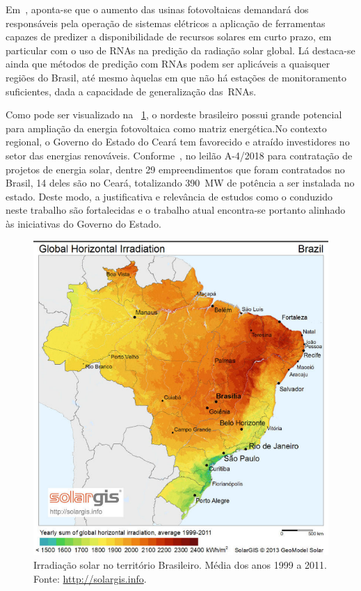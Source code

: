 \documentclass[a4paper]{ifacconf}
\begin{document}
Em~\cite{Mendes2017}, aponta-se que o aumento das usinas fotovoltaicas demandará dos responsáveis pela operação de sistemas elétricos a aplicação de ferramentas capazes de predizer a disponibilidade de recursos solares em curto prazo, em particular com o uso de \acp{RNA} na predição da radiação solar global. Lá destaca-se ainda que métodos de predição com \acp{RNA} podem ser aplicáveis a quaisquer regiões do Brasil, até mesmo àquelas em que não há estações de monitoramento suficientes, dada a capacidade de generalização das~\acp{RNA}.

Como pode ser visualizado na ~\ref{fig:mapa}, o nordeste brasileiro possui grande potencial para ampliação da energia fotovoltaica como matriz energética.No contexto regional, o Governo do Estado do Ceará tem favorecido e atraído investidores no setor das energias renováveis. Conforme~\cite{Epe2018}, no leilão A-4/2018 para contratação de projetos de energia solar, dentre 29 empreendimentos que foram contratados no Brasil, 14 deles são no Ceará, totalizando 390~MW de potência a ser instalada no estado. Deste modo, a justificativa e relevância de estudos como o conduzido neste trabalho são fortalecidas e o trabalho atual encontra-se portanto alinhado às iniciativas do Governo do Estado.

\begin{figure}
	\centering
	\includegraphics[width=0.8\columnwidth]{images/mapa.png}
	\caption{Irradiação solar no território Brasileiro. Média dos anos 1999 a 2011. Fonte:
		\protect\url{http://solargis.info}.}\label{fig:mapa}
\end{figure}
\end{document}
